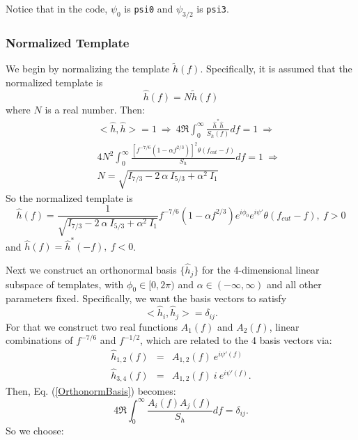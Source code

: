 Notice that in the code, $\psi_0$ is \texttt{psi0} and $\psi_{3/2}$ is
\texttt{psi3}.

\subsubsection*{Normalized Template}
\label{NormOfTemplate}

We begin by normalizing the template $\tilde{h}(f)$.
Specifically, it is assumed that the normalized template is
\begin{equation}
\hat{h}(f) = N \tilde{h}(f)
\end{equation}
where $N$ is a real number. Then:
\begin{eqnarray}
&& <\hat{h}, \hat{h}> = 1 \: \Rightarrow  \:
4 \Re \int_0^{\infty} \frac{\hat{h}^{\ast} \hat{h}}{S_h(f)} df = 1 \: 
	\Rightarrow  \\
&& 4 N^2 \int_0^{\infty} \frac{ [ f^{-7/6} (1-\alpha f^{2/3})]^2 \theta
	(f_{cut}-f) }{S_h} df = 1 \: \Rightarrow \\
&& N = \sqrt{ I_{7/3} - 2 \: \alpha \: I_{5/3} + \alpha^2 \: I_1 }
\label{Normalize}
\end{eqnarray}
So the normalized template is
\begin{equation}
\hat{h}(f) = \frac{1}{\sqrt{ I_{7/3} - 2 \: \alpha \: I_{5/3} + 
	\alpha^2 \: I_1 }} f^{-7/6} (1-\alpha f^{2/3}) e^{i \phi_0} e^{i \psi'}
	\theta(f_{cut}-f), \: f>0
\end{equation}
and $\hat{h}(f) = \hat{h}^{\ast}(-f), \: f<0$.

Next we construct an orthonormal basis $\{ \hat{h}_j \}$ for the 4-dimensional 
linear subspace of templates, with $\phi_0 \in [0,2\pi)$ and 
$\alpha \in (-\infty, \infty)$ and all other parameters fixed.
Specifically, we want the basis vectors to satisfy
\begin{equation}
< \hat{h}_i , \hat{h}_j > = \delta_{ij}.
\label{OrthonormBasis}
\end{equation}
For that we construct two real functions $A_1(f)$ and $A_2(f)$, linear 
combinations of $f^{-7/6}$ and $f^{-1/2}$, which are related to the 4 basis
vectors via:
\begin{eqnarray}
 \hat{h}_{1,2}(f) &=& A_{1,2}(f) \: e^{i \psi'(f)} \\
 \hat{h}_{3,4}(f) &=& A_{1,2}(f) \: i \: e^{i \psi'(f)}.
\end{eqnarray}
Then, Eq. (\ref{OrthonormBasis}) becomes:
\begin{equation}
4 \Re \int_0^{\infty} \frac{A_i(f) A_j(f)}{S_h} df = \delta_{ij}.
\label{OrthonormA}
\end{equation}
So we choose:

